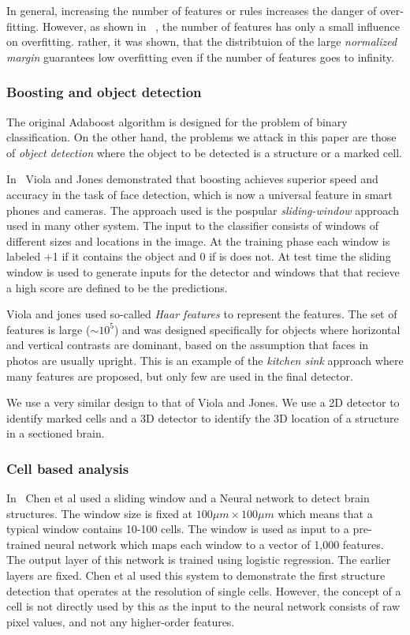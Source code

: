 \documentclass[11pt]{article}
\begin{document}
In general, increasing the number of features or rules increases the
danger of over-fitting. However, as shown in ~\cite{SchapireFrBaLe98}, the
number of features has only a small influence on overfitting. rather,
it was shown, that the distribtuion of the large {\em normalized
  margin} guarantees low overfitting even if the number of features
goes to infinity.


\subsubsection{Boosting and object detection}
The original Adaboost algorithm is designed for the problem of binary
classification. On the other hand, the problems we attack in this
paper are those of {\em object detection} where the object to be
detected is a structure or a marked cell.

In~\cite{violajones01} Viola and Jones demonstrated that boosting
achieves superior speed and accuracy in the task of face detection,
which is now a universal feature in smart phones and cameras.  The
approach used is the pospular {\em sliding-window} approach used in
many other system.  The input to the classifier consists of windows of
different sizes and locations in the image. At the training phase each
window is labeled +1 if it contains the object and 0 if is does
not. At test time the sliding window is used to generate inputs for
the detector and windows that that recieve a high score are defined to
be the predictions.

Viola and jones used so-called {\em Haar features} to represent the
features. The set of features is large ($\sim 10^5$) and was designed
specifically for objects where horizontal and vertical contrasts are
dominant, based on the assumption that faces in photos are usually
upright. This is an example of the {\em kitchen sink} approach where
many features are proposed, but only few are used in the final detector.

We use a very similar design to that of Viola and Jones. We use a 2D
detector to identify marked cells and a 3D detector to identify the 3D
location of a structure in a sectioned brain.

\subsubsection{Cell based analysis}

In~\cite{chen2019active} Chen et al used a sliding window and a
Neural network to detect brain structures. The window size is fixed at
$100 \mu m \times 100 \mu m$ which means that a typical window contains 10-100 cells.
The window is used as input to a pre-trained neural network which maps
each window to a vector of 1,000 features. The output layer of
this network is trained using logistic regression. The earlier layers
are fixed. Chen et al used this system to demonstrate the first
structure detection that operates at the resolution of single cells.
However, the concept of a cell is not directly used by this as the
input to the neural network consists of raw pixel values, and not any
higher-order features.
\end{document}
